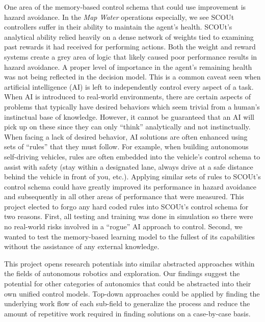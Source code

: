One area of the memory-based control schema that could use improvement is hazard avoidance.
In the \textit{Map Water} operations especially, we see SCOUt controllers suffer in their ability to maintain the agent's health.
SCOUt's analytical ability relied heavily on a dense network of weights tied to examining past rewards it had received for performing actions.
Both the weight and reward systems create a grey area of logic that likely caused poor performance results in hazard avoidance.
A proper level of importance in the agent's remaining health was not being reflected in the decision model.
This is a common caveat seen when artificial intelligence (AI) is left to independently control every aspect of a task.
When AI is introduced to real-world environments, there are certain aspects of problems that typically have desired behaviors which seem trivial from a human's instinctual base of knowledge.
However, it cannot be guaranteed that an AI will pick up on these since they can only ``think'' analytically and not instinctually.
When facing a lack of desired behavior, AI solutions are often enhanced using sets of ``rules'' that they must follow.
For example, when building autonomous self-driving vehicles, rules are often embedded into the vehicle's control schema to assist with safety (stay within a designated lane, always drive at a safe distance behind the vehicle in front of you, etc.).
Applying similar sets of rules to SCOUt's control schema could have greatly improved its performance in hazard avoidance and subsequently in all other areas of performance that were measured.
This project elected to forgo any hard coded rules into SCOUt's control schema for two reasons.
First, all testing and training was done in simulation so there were no real-world risks involved in a ``rogue'' AI approach to control.
Second, we wanted to test the memory-based learning model to the fullest of its capabilities without the assistance of any external knowledge.

This project opens research potentials into similar abstracted approaches within the fields of autonomous robotics and exploration.
Our findings suggest the potential for other categories of autonomics that could be abstracted into their own unified control models.
Top-down approaches could be applied by finding the underlying work flow of each sub-field to generalize the process and reduce the amount of repetitive work required in finding solutions on a case-by-case basis.
